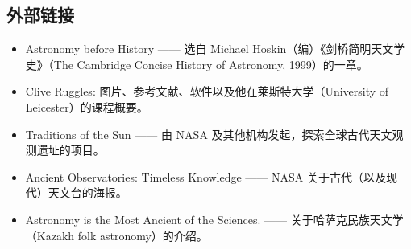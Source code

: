 \subsection{外部链接}
\begin{itemize}
    \item Astronomy before History —— 选自 Michael Hoskin（编）《剑桥简明天文学史》（The Cambridge Concise History of Astronomy, 1999）的一章。
    \item Clive Ruggles: 图片、参考文献、软件以及他在莱斯特大学（University of Leicester）的课程概要。
    \item Traditions of the Sun —— 由 NASA 及其他机构发起，探索全球古代天文观测遗址的项目。
    \item Ancient Observatories: Timeless Knowledge —— NASA 关于古代（以及现代）天文台的海报。
    \item Astronomy is the Most Ancient of the Sciences. —— 关于哈萨克民族天文学（Kazakh folk astronomy）的介绍。
\end{itemize}








